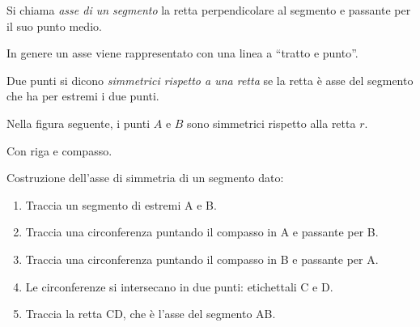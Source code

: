 \begin{definizione}\label{def:asse_segmento}
Si chiama \emph{asse di un segmento} la retta perpendicolare al 
segmento e passante per il suo punto medio.
\end{definizione}

In genere un asse viene rappresentato con una linea a ``tratto e punto''.

\begin{definizione}
Due punti si dicono \emph{simmetrici rispetto a una retta} se la 
retta è asse del segmento che ha per estremi i due punti.
\end{definizione}

Nella figura seguente, i punti \(A\) e \(B\) sono simmetrici 
rispetto alla retta \(r\).

\begin{minipage}{.49\textwidth}
 \begin{inaccessibleblock}
\begin{center}\end{center}
\end{inaccessibleblock}
\end{minipage}
\begin{minipage}{.49\textwidth}
 \begin{inaccessibleblock}
\begin{center}\end{center}
\end{inaccessibleblock}
\end{minipage}

Con riga e compasso.

\begin{procedura}\label{proc:fonda_asse}
  Costruzione dell'asse di simmetria di un segmento dato:
  \begin{enumerate} [nosep]
    \item 
    Traccia un segmento di estremi A e B.
    \item 
    Traccia una circonferenza puntando il compasso in A e passante per B.
    \item 
    Traccia una circonferenza puntando il compasso in B e passante per A.  
    \item 
    Le circonferenze si intersecano in due punti: etichettali C e D.
    \item 
    Traccia la retta CD, che è l'asse del segmento AB.
  \end{enumerate}
\end{procedura}

